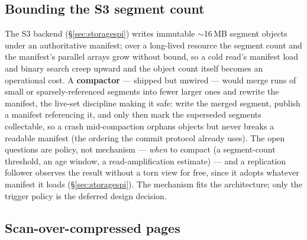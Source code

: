 \documentclass[11pt,a4paper,oneside]{report}
\theoremstyle{sirixthm}
\begin{document}
\subsection*{Bounding the S3 segment count}

The S3 backend (\S\ref{sec:storagespi}) writes immutable $\sim$16\,MB segment objects under an
authoritative manifest; over a long-lived resource the segment count and the manifest's parallel arrays
grow without bound, so a cold read's manifest load and binary search creep upward and the object count
itself becomes an operational cost. A \textbf{compactor} --- shipped but unwired --- would merge runs of
small or sparsely-referenced segments into fewer larger ones and rewrite the manifest, the live-set
discipline making it safe: write the merged segment, publish a manifest referencing it, and only then mark
the superseded segments collectable, so a crash mid-compaction orphans objects but never breaks a readable
manifest (the ordering the commit protocol already uses). The open questions are policy, not mechanism ---
\emph{when} to compact (a segment-count threshold, an age window, a read-amplification estimate) --- and a
replication follower observes the result without a torn view for free, since it adopts whatever manifest it
loads (\S\ref{sec:storagespi}). The mechanism fits the architecture; only the trigger policy is the
deferred design decision.

\subsection*{Scan-over-compressed pages}
\end{document}
